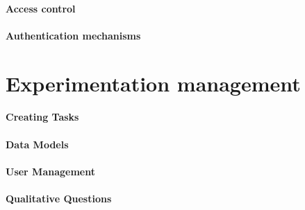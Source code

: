 \paragraph{Access control}
\paragraph{Authentication mechanisms}

\section{Experimentation management}
\label{sc:section:experimentation}

\paragraph{Creating Tasks}

\paragraph{Data Models}

\paragraph{User Management}

\paragraph{Qualitative Questions}